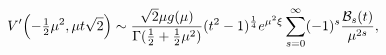 \[\mathop{V\/}\nolimits'\!\left(-\tfrac{1}{2}\mu^{2},\mu t\sqrt{2}\right)\sim%
\frac{\sqrt{2}\mu g(\mu)}{\mathop{\Gamma\/}\nolimits(\frac{1}{2}+\frac{1}{2}%
\mu^{2})}(t^{2}-1)^{\frac{1}{4}}\*e^{\mu^{2}\xi}\sum_{s=0}^{\infty}(-1)^{s}%
\frac{{\cal B}_{s}(t)}{\mu^{2s}},\]